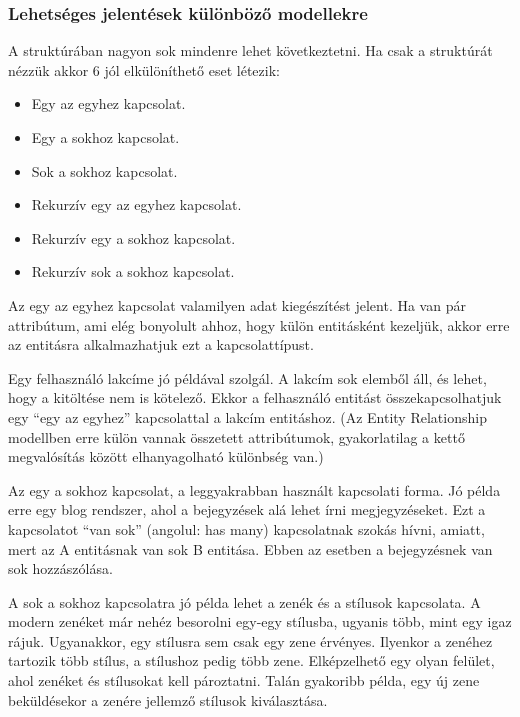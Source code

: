 \documentclass[a4paper,12pt,oneside]{report}
\begin{document}
\subsubsection{Lehetséges jelentések különböző modellekre}
\begin{justify}

	A struktúrában nagyon sok mindenre lehet következtetni. Ha csak a struktúrát nézzük akkor 6 jól elkülöníthető eset létezik:

	\begin{itemize}
		\item Egy az egyhez kapcsolat.
		\item Egy a sokhoz kapcsolat.
		\item Sok a sokhoz kapcsolat.
		\item Rekurzív egy az egyhez kapcsolat.
		\item Rekurzív egy a sokhoz kapcsolat.
		\item Rekurzív sok a sokhoz kapcsolat.
	\end{itemize}

    Az egy az egyhez kapcsolat valamilyen adat kiegészítést jelent. Ha van pár attribútum, ami elég bonyolult ahhoz, hogy külön entitásként kezeljük, akkor erre az entitásra alkalmazhatjuk ezt a kapcsolattípust. 
    
    Egy felhasználó lakcíme jó példával szolgál. A lakcím sok elemből áll, és lehet, hogy a kitöltése nem is kötelező. Ekkor a felhasználó entitást összekapcsolhatjuk egy “egy az egyhez” kapcsolattal a lakcím entitáshoz. (Az Entity Relationship modellben erre külön vannak összetett attribútumok, gyakorlatilag a kettő megvalósítás között elhanyagolható különbség van.)

    Az egy a sokhoz kapcsolat, a leggyakrabban használt kapcsolati forma. Jó példa erre egy blog rendszer, ahol a bejegyzések alá lehet írni megjegyzéseket. Ezt a kapcsolatot “van sok” (angolul: has many) kapcsolatnak szokás hívni, amiatt, mert az A entitásnak van sok B entitása. Ebben az esetben a bejegyzésnek van sok hozzászólása.

    A sok a sokhoz kapcsolatra jó példa lehet a zenék és a stílusok kapcsolata. A modern zenéket már nehéz besorolni egy-egy stílusba, ugyanis több, mint egy igaz rájuk. Ugyanakkor, egy stílusra sem csak egy zene érvényes. Ilyenkor a zenéhez tartozik több stílus, a stílushoz pedig több zene. Elképzelhető egy olyan felület, ahol zenéket és stílusokat kell pároztatni. Talán gyakoribb példa, egy új zene beküldésekor a zenére jellemző stílusok kiválasztása.   


\end{justify}
\end{document}
